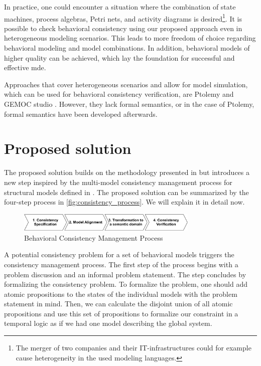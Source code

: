 \documentclass[conference]{IEEEtran}
\begin{document}
In practice, one could encounter a situation where the combination of state machines, process algebras, Petri nets, and activity diagrams is desired\footnote{The merger of two companies and their IT-infrastructures could for example cause heterogeneity in the used modeling languages.}.
It is possible to check behavioral consistency using our proposed approach even in heterogeneous modeling scenarios.
This leads to more freedom of choice regarding behavioral modeling and model combinations.
In addition, behavioral models of higher quality can be achieved, which lay the foundation for successful and effective \gls{mde}.

Approaches that cover heterogeneous scenarios and allow for model simulation, which can be used for behavioral consistency verification, are Ptolemy \cite{ekerTamingHeterogeneityPtolemy2003} and GEMOC studio \cite{deantoniModelingBehavioralSemantics2016}.
However, they lack formal semantics, or in the case of Ptolemy, formal semantics have been developed afterwards\cite{tripakisModularFormalSemantics2013}.

\section{Proposed solution}
The proposed solution builds on the methodology presented in \cite{engelsMethodologySpecifyingAnalyzing2001} but introduces a new step inspired by the multi-model consistency management process for structural models defined in \cite{stunkelMultipleModelSynchronization2020}.
The proposed solution can be summarized by the four-step process in \autoref{fig:consistency_process}.
We will explain it in detail now.

\begin{figure}[h]
    \centering
    \includegraphics[width=3.4in]{methodology}
    \caption{Behavioral Consistency Management Process}
    \label{fig:consistency_process}
\end{figure}
A potential consistency problem for a set of behavioral models triggers the consistency management process.
The first step of the process begins with a problem discussion and an informal problem statement.
The step concludes by formalizing the consistency problem.
To formalize the problem, one should add atomic propositions to the states of the individual models with the problem statement in mind.
Then, we can calculate the disjoint union of all atomic propositions and use this set of propositions to formalize our constraint in a temporal logic as if we had one model describing the global system.
\end{document}
